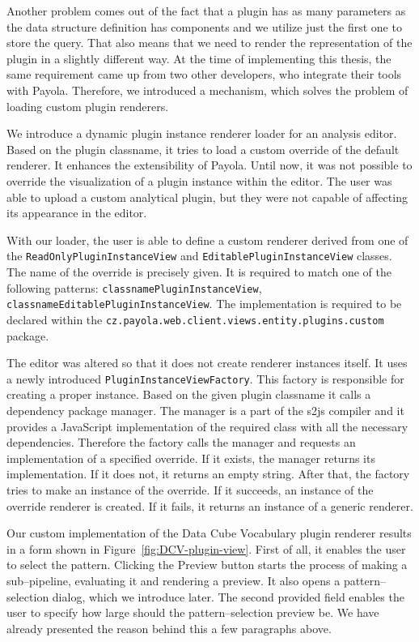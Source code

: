 Another problem comes out of the fact that a plugin has as many parameters as 
the data structure definition has components and we utilize just the first one 
to store the query. That also means that we need to render the representation 
of the plugin in a slightly different way. At the time of implementing this 
thesis, the same requirement came up from two other developers, who integrate their 
tools with Payola. Therefore, we introduced a mechanism, which solves the 
problem of loading custom plugin renderers.

We introduce a dynamic plugin instance renderer loader for an analysis editor. 
Based on the plugin classname, it tries to load a custom override of the default 
renderer. It enhances the extensibility of Payola. Until now, it was not 
possible to override the visualization of a plugin instance within the editor. The 
user was able to upload a custom analytical plugin, but they were not capable of affecting its
appearance in the editor.

\begin{sloppypar}
With our loader, the user is able to define a custom renderer derived from 
one of the \texttt{ReadOnlyPluginInstanceView} and \texttt{EditablePluginInstanceView} 
classes. The name of the override is precisely given. It is required to match one 
of the following patterns: \texttt{{classname}PluginInstanceView},
\texttt{{classname}EditablePluginInstanceView}. The implementation is required to
be declared within the \texttt{cz.payola.web.client.views.entity.plugins.custom} package.
\end{sloppypar}

The editor was altered so that it does not create renderer instances itself. It 
uses a newly introduced \texttt{PluginInstance\allowbreak ViewFactory}. This 
factory is responsible for creating a proper instance. Based on the given plugin 
classname it calls a dependency package manager. The manager is a part of the 
s2js compiler and it provides a JavaScript implementation of the required class
with all the necessary dependencies. Therefore the factory calls the manager and 
requests an implementation of a specified override. If it exists, the manager 
returns its implementation. If it does not, it returns an empty string. After 
that, the factory tries to make an instance of the override. If it succeeds, an 
instance of the override renderer is created. If it fails, it returns an 
instance of a generic renderer. 
 
Our custom implementation of the Data Cube Vocabulary plugin renderer results 
in a form shown in Figure~\ref{fig:DCV-plugin-view}. First of all, it 
enables the user to select the pattern. Clicking the Preview button starts the process of making a
sub--pipeline, evaluating it and rendering a preview. It also opens a pattern--selection
dialog, which we introduce later. The second provided field enables the user to specify how large should 
the pattern--selection preview be. We have already presented the reason behind this 
a few paragraphs above.

